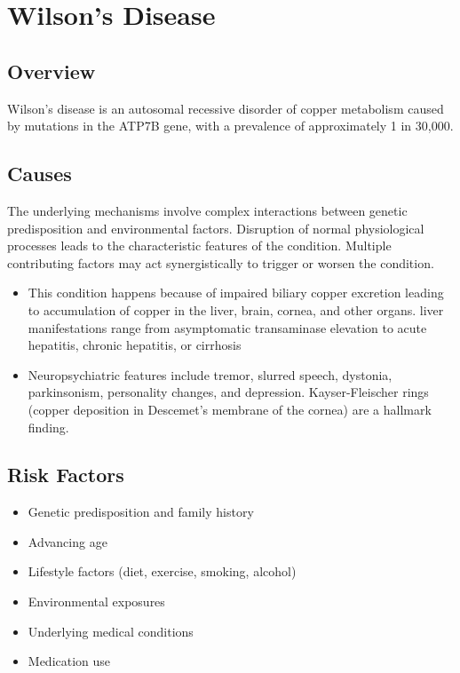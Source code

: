 \chapter{Wilson's Disease}
\label{sec:Wilson's Disease}

\section{Overview}
Wilson's disease is an autosomal recessive disorder of copper metabolism caused by mutations in the ATP7B gene, with a prevalence of approximately 1 in 30,000.
\section{Causes}
The underlying mechanisms involve complex interactions between genetic predisposition and environmental factors. Disruption of normal physiological processes leads to the characteristic features of the condition. Multiple contributing factors may act synergistically to trigger or worsen the condition.

\begin{itemize}[noitemsep]
  \item This condition happens because of impaired biliary copper excretion leading to accumulation of copper in the liver, brain, cornea, and other organs. liver manifestations range from asymptomatic transaminase elevation to acute hepatitis, chronic hepatitis, or cirrhosis
  \item Neuropsychiatric features include tremor, slurred speech, dystonia, parkinsonism, personality changes, and depression. Kayser-Fleischer rings (copper deposition in Descemet's membrane of the cornea) are a hallmark finding.
\end{itemize}
\section{Risk Factors}


\begin{itemize}[noitemsep]
  \item Genetic predisposition and family history
  \item Advancing age
  \item Lifestyle factors (diet, exercise, smoking, alcohol)
  \item Environmental exposures
  \item Underlying medical conditions
  \item Medication use
\end{itemize}
